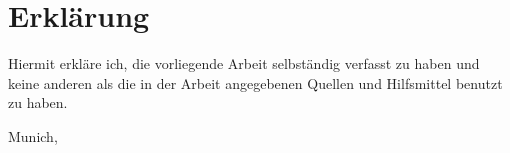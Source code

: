 \makeatletter

\chapter*{Erklärung}

Hiermit erkläre ich, die vorliegende Arbeit selbständig verfasst zu haben und keine anderen als die in der Arbeit angegebenen Quellen und Hilfsmittel benutzt zu haben.

\vspace{1cm}

\par\noindent%
Munich, \@date \hfill\makebox[2.0in]{\hrulefill}%
\vspace{-\parskip}\par\noindent%
\hfill{}

\makeatother
